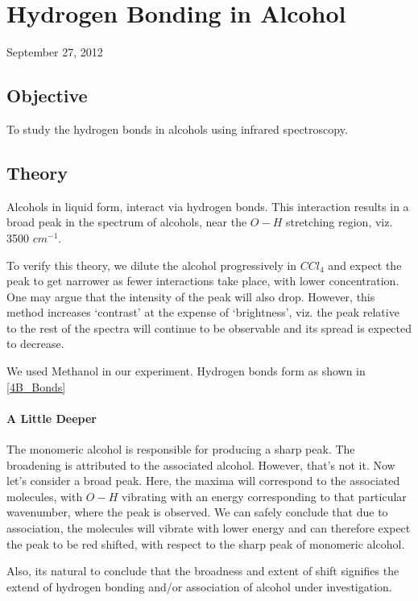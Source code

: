 \chapter{Hydrogen Bonding in Alcohol}
\begin{flushright}
September 27, 2012
\end{flushright}
\section{Objective}
To study the hydrogen bonds in alcohols using infrared spectroscopy.

\section{Theory}
	Alcohols in liquid form, interact via hydrogen bonds. This interaction results in a broad peak in the spectrum of alcohols, near the $O-H$ stretching region, viz. 3500 $cm^{-1}$.
	\par
	To verify this theory, we dilute the alcohol progressively in $CCl_{4}$ and expect the peak to get narrower as fewer interactions take place, with lower concentration. One may argue that the intensity of the peak will also drop. However, this method increases `contrast' at the expense of `brightness', viz. the peak relative to the rest of the spectra will continue to be observable and its spread is expected to decrease.
	\par
	We used Methanol in our experiment. Hydrogen bonds form as shown in \autoref{4B_Bonds}
	\par
	\subsubsection{A Little Deeper}
		The monomeric alcohol is responsible for producing a sharp peak. The broadening is attributed to the associated alcohol. However, that's not it. Now let's consider a broad peak. Here, the maxima will correspond to the associated molecules, with $O-H$ vibrating with an energy corresponding to that particular wavenumber, where the peak is observed. We can safely conclude that due to association, the molecules will vibrate with lower energy and can therefore expect the peak to be red shifted, with respect to the sharp peak of monomeric alcohol.
		\par
		Also, its natural to conclude that the broadness and extent of shift signifies the extend of hydrogen bonding and/or association of alcohol under investigation.


